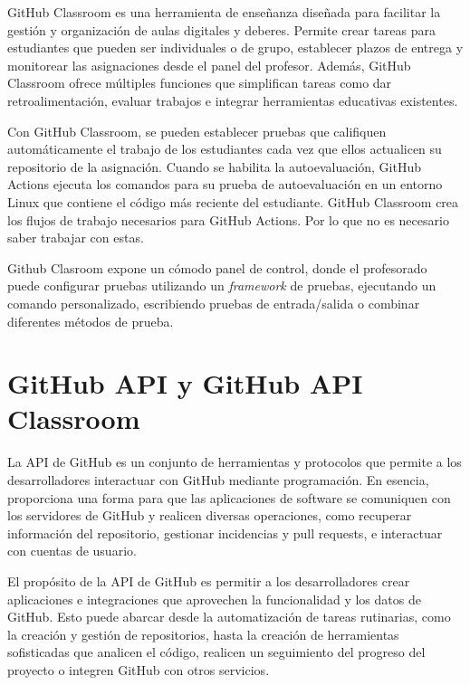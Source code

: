 GitHub Classroom es una herramienta de enseñanza diseñada para facilitar la gestión y organización de aulas digitales y deberes. Permite crear tareas para estudiantes que pueden ser  individuales o de grupo, establecer plazos de entrega y monitorear las asignaciones desde el panel del profesor. Además, GitHub Classroom ofrece múltiples funciones que simplifican tareas como dar retroalimentación, evaluar trabajos e integrar herramientas educativas existentes\cite{githubAboutClassroom}.

Con GitHub Classroom, se pueden establecer pruebas que califiquen automáticamente el trabajo de los estudiantes cada vez que ellos actualicen su repositorio de la asignación. Cuando se habilita la autoevaluación, GitHub Actions\cite{githubUnderstandingActions} ejecuta los comandos para su prueba de autoevaluación en un entorno Linux que contiene el código más reciente del estudiante. GitHub Classroom crea los flujos de trabajo necesarios para GitHub Actions. Por lo que no es necesario saber trabajar con estas\cite{githubAutogradingClasroom}.

Github Clasroom expone un cómodo panel de control, donde el profesorado puede configurar pruebas utilizando un \textit{framework} de pruebas, ejecutando un comando personalizado, escribiendo pruebas de entrada/salida o combinar diferentes métodos de prueba\cite{githubAutogradingClasroom}.

\section{GitHub API y GitHub API Classroom}
La \acrshort{API} de GitHub es un conjunto de herramientas y protocolos que permite a los desarrolladores interactuar con GitHub mediante programación. En esencia, proporciona una forma para que las aplicaciones de software se comuniquen con los servidores de GitHub y realicen diversas operaciones, como recuperar información del repositorio, gestionar incidencias y pull requests, e interactuar con cuentas de usuario.\cite{githubAPI}

El propósito de la \acrshort{API} de GitHub es permitir a los desarrolladores crear aplicaciones e integraciones que aprovechen la funcionalidad y los datos de GitHub. Esto puede abarcar desde la automatización de tareas rutinarias, como la creación y gestión de repositorios, hasta la creación de herramientas sofisticadas que analicen el código, realicen un seguimiento del progreso del proyecto o integren GitHub con otros servicios.

